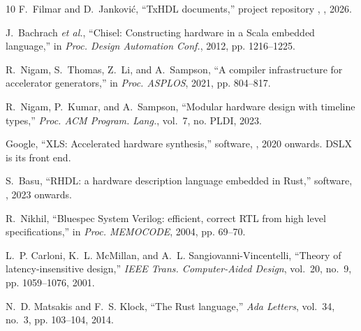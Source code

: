 \documentclass[journal,9pt]{IEEEtran}
\begin{document}
\begin{thebibliography}{10}
F.~Filmar and D.~Janković, ``TxHDL documents,'' project repository
, , 2026.

J.~Bachrach \emph{et al.}, ``Chisel: Constructing hardware in a Scala
embedded language,'' in \emph{Proc. Design Automation Conf.}, 2012, pp.
1216--1225.

R.~Nigam, S.~Thomas, Z.~Li, and A.~Sampson, ``A compiler infrastructure
for accelerator generators,'' in \emph{Proc. ASPLOS}, 2021, pp. 804--817.

R.~Nigam, P.~Kumar, and A.~Sampson, ``Modular hardware design with
timeline types,'' \emph{Proc. ACM Program. Lang.}, vol.~7, no. PLDI, 2023.

Google, ``XLS: Accelerated hardware synthesis,'' software,
, 2020 onwards. DSLX is its front
end.

S.~Basu, ``RHDL: a hardware description language embedded in Rust,''
software, , 2023 onwards.

R.~Nikhil, ``Bluespec System Verilog: efficient, correct RTL from high level
specifications,'' in \emph{Proc. MEMOCODE}, 2004, pp. 69--70.

L.~P. Carloni, K.~L. McMillan, and A.~L. Sangiovanni-Vincentelli, ``Theory
of latency-insensitive design,'' \emph{IEEE Trans. Computer-Aided Design},
vol.~20, no.~9, pp. 1059--1076, 2001.

N.~D. Matsakis and F.~S. Klock, ``The Rust language,'' \emph{Ada Letters},
vol.~34, no.~3, pp. 103--104, 2014.

\end{thebibliography}
\end{document}
